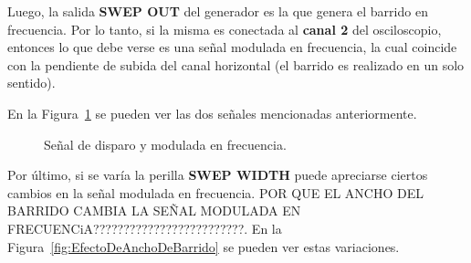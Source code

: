     Luego, la salida \textbf{SWEP OUT} del generador es la que genera el barrido en frecuencia. Por lo tanto, si la misma
    es conectada al \textbf{canal 2} del osciloscopio, entonces lo que debe verse es una señal modulada en frecuencia, la cual
    coincide con la pendiente de subida del canal horizontal (el barrido es realizado en un solo sentido). 

    En la Figura~\ref{fig:SeñalDisparoySeñalFM} se pueden ver las dos señales mencionadas anteriormente.

    \begin{figure}[H]
      \centering
      \caption{Señal de disparo y modulada en frecuencia.}
      \label{fig:SeñalDisparoySeñalFM}
    \end{figure}

    Por último, si se varía la perilla \textbf{SWEP WIDTH} puede apreciarse ciertos cambios en la señal modulada en frecuencia.
    POR QUE EL ANCHO DEL BARRIDO CAMBIA LA SEÑAL MODULADA EN FRECUENCiA?????????????????????????. En la 
    Figura~\ref{fig:EfectoDeAnchoDeBarrido} se pueden ver estas variaciones.


